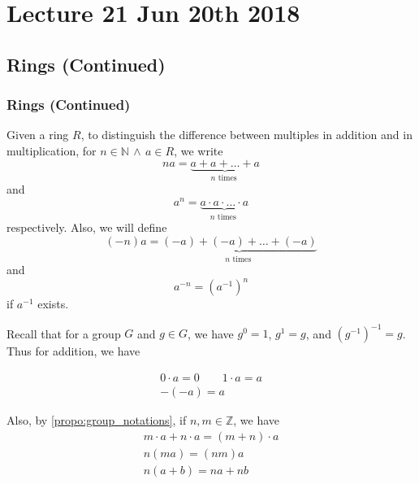 \chapter{Lecture 21 Jun 20th 2018}%
\label{chp:lecture_21_jun_20th_2018}

\section{Rings (Continued)}%
\label{sec:rings_continued}

\subsection{Rings (Continued)}%
\label{sub:rings_continued}

\begin{note}[Notation]
  Given a ring $R$, to distinguish the difference between multiples in addition and in multiplication, for $n \in \mathbb{N} \, \land \, a \in R$, we write
  \begin{equation*}
    na = \underbrace{a + a + \hdots + a}_{n \text{ times }}
  \end{equation*}
  and
  \begin{equation*}
    a^n = \underbrace{a \cdot a \cdot \hdots \cdot a}_{n \text{ times }}
  \end{equation*}
  respectively. Also, we will define
  \begin{equation*}
    (-n) a = \underbrace{(-a) + (-a) + \hdots + (-a)}_{n \text{ times }}
  \end{equation*}
  and
  \begin{equation*}
    a^{-n} = \left( a^{-1} \right)^n
  \end{equation*}
  if $a^{-1}$ exists.
\end{note}

\begin{note}
  Recall that for a group $G$ and $g \in G$, we have $g^0 = 1$, $g^1 = g$, and $\left(g^{-1}\right)^{-1} = g$. Thus for addition, we have

  \begin{gather*}
    0 \cdot a = 0 \qquad 1 \cdot a = a \\
    -(-a)=a
  \end{gather*}

  Also, by \cref{propo:group_notations}, if $n, m \in \mathbb{Z}$, we have
  \begin{gather*}
    m \cdot a + n \cdot a = (m + n) \cdot a \\
    n(ma) = (nm)a \\
    n(a + b) = na + nb
  \end{gather*}
\end{note}


